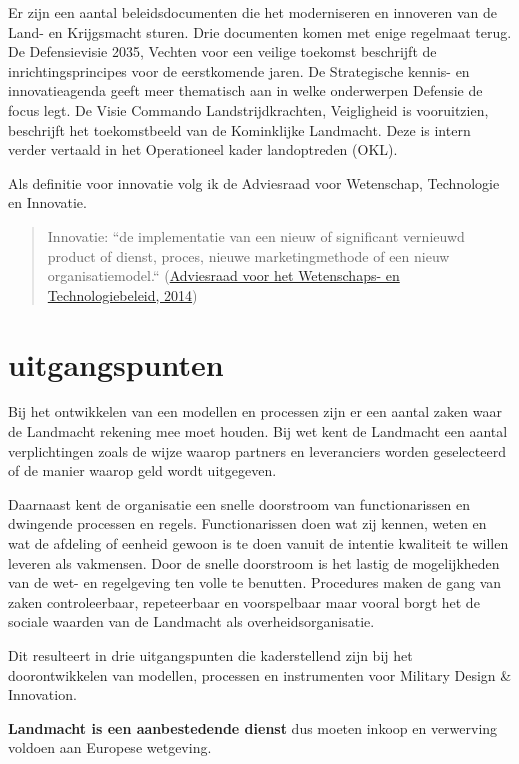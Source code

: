 \documentclass[
]{book}
\begin{document}
Er zijn een aantal beleidsdocumenten die het moderniseren en innoveren van de Land- en Krijgsmacht sturen. Drie documenten komen met enige regelmaat terug. De Defensievisie 2035, Vechten voor een veilige toekomst beschrijft de inrichtingsprincipes voor de eerstkomende jaren. De Strategische kennis- en innovatieagenda geeft meer thematisch aan in welke onderwerpen Defensie de focus legt. De Visie Commando Landstrijdkrachten, Veigligheid is vooruitzien, beschrijft het toekomstbeeld van de Kominklijke Landmacht. Deze is intern verder vertaald in het Operationeel kader landoptreden (OKL).

Als definitie voor innovatie volg ik de Adviesraad voor Wetenschap, Technologie en Innovatie.

\begin{quote}
Innovatie: ``de implementatie van een nieuw of significant vernieuwd product of dienst, proces, nieuwe marketingmethode of een nieuw organisatiemodel.`` (\protect\hyperlink{ref-awti-2014}{Adviesraad voor het Wetenschaps- en Technologiebeleid, 2014})
\end{quote}

\hypertarget{uitgangspunten}{%
\section{uitgangspunten}\label{uitgangspunten}}

Bij het ontwikkelen van een modellen en processen zijn er een aantal zaken waar de Landmacht rekening mee moet houden. Bij wet kent de Landmacht een aantal verplichtingen zoals de wijze waarop partners en leveranciers worden geselecteerd of de manier waarop geld wordt uitgegeven.

Daarnaast kent de organisatie een snelle doorstroom van functionarissen en dwingende processen en regels.
Functionarissen doen wat zij kennen, weten en wat de afdeling of eenheid gewoon is te doen vanuit de intentie kwaliteit te willen leveren als vakmensen. Door de snelle doorstroom is het lastig de mogelijkheden van de wet- en regelgeving ten volle te benutten.
Procedures maken de gang van zaken controleerbaar, repeteerbaar en voorspelbaar maar vooral borgt het de sociale waarden van de Landmacht als overheidsorganisatie.

Dit resulteert in drie uitgangspunten die kaderstellend zijn bij het doorontwikkelen van modellen, processen en instrumenten voor Military Design \& Innovation.

\textbf{Landmacht is een aanbestedende dienst}
dus moeten inkoop en verwerving voldoen aan Europese wetgeving.
\end{document}
